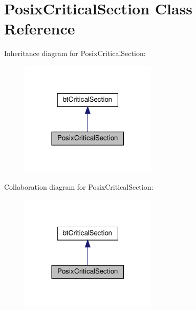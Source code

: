 \hypertarget{classPosixCriticalSection}{}\section{Posix\+Critical\+Section Class Reference}
\label{classPosixCriticalSection}


Inheritance diagram for Posix\+Critical\+Section\+:
\nopagebreak
\begin{figure}[H]
\begin{center}
\leavevmode
\includegraphics[width=185pt]{classPosixCriticalSection__inherit__graph}
\end{center}
\end{figure}


Collaboration diagram for Posix\+Critical\+Section\+:
\nopagebreak
\begin{figure}[H]
\begin{center}
\leavevmode
\includegraphics[width=185pt]{classPosixCriticalSection__coll__graph}
\end{center}
\end{figure}
